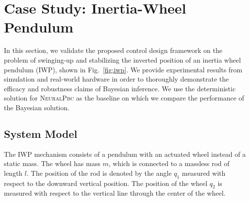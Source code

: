 \section{Case Study: Inertia-Wheel Pendulum}
\label{sec:iwp}

In this section, we validate the proposed control design framework on the
problem of swinging-up and stabilizing the inverted position of an inertia wheel
pendulum (IWP), shown in Fig.~\ref{fig:iwp}. We provide experimental results
from simulation and real-world hardware in order to thoroughly demonstrate the
efficacy and robustness claims of Bayesian inference. 
%
We use the deterministic solution for \textsc{NeuralPbc} as the baseline
on which we compare the performance of the Bayesian solution.


\subsection{System Model}
\label{ssec:model}

The IWP mechanism consists of a pendulum with an actuated wheel instead of a static
mass.
%
The wheel has mass $m$, which is connected to a massless rod of length \(l\). 
%
The position of the rod is denoted by the angle \(q_1\) measured with
respect to the downward vertical position.
%
The position of the wheel \(q_2\) is measured with respect to the vertical
line through the center of the wheel.

